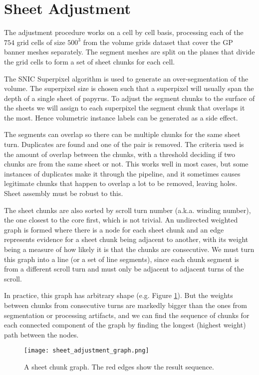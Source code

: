 \documentclass{article}
\begin{document}
\section{Sheet Adjustment}

The adjustment procedure works on a cell by cell basis, processing each of the $754$ grid cells of size $500^3$ from the volume grids dataset that cover the GP banner meshes separately. The segment meshes are split on the planes that divide the grid cells to form a set of sheet chunks for each cell.

The SNIC Superpixel algorithm is used to generate an over-segmentation of the volume. The superpixel size is chosen such that a superpixel will usually span the depth of a single sheet of papyrus. To adjust the segment chunks to the surface of the sheets we will assign to each superpixel the segment chunk that overlaps it the most. Hence volumetric instance labels can be generated as a side effect.

The segments can overlap so there can be multiple chunks for the same sheet turn. Duplicates are found and one of the pair is removed. The criteria used is the amount of overlap between the chunks, with a threshold deciding if two chunks are from the same sheet or not. This works well in most cases, but some instances of duplicates make it through the pipeline, and it sometimes causes legitimate chunks that happen to overlap a lot to be removed, leaving holes. Sheet assembly must be robust to this.

The sheet chunks are also sorted by scroll turn number (a.k.a. winding number), the one closest to the core first, which is not trivial. An undirected weighted graph is formed where there is a node for each sheet chunk and an edge represents evidence for a sheet chunk being adjacent to another, with its weight being a measure of how likely it is that the chunks are consecutive. We must turn this graph into a line (or a set of line segments), since each chunk segment is from a different scroll turn and must only be adjacent to adjacent turns of the scroll.

In practice, this graph has arbitrary shape (e.g. Figure \ref{chunk-graph}). But the weights between chunks from consecutive turns are markedly bigger than the ones from segmentation or processing artifacts, and we can find the sequence of chunks for each connected component of the graph by finding the longest (highest weight) path between the nodes.

\begin{figure}
    \centering
    \texttt{[image: sheet\_adjustment\_graph.png]}
    \caption{A sheet chunk graph. The red edges show the result sequence.}
    \label{chunk-graph}
\end{figure}
\end{document}

